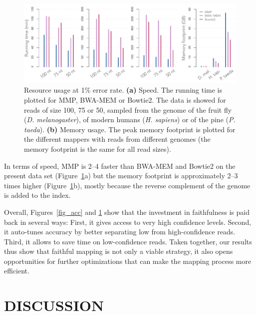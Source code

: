\documentclass[a4,center,fleqn]{NAR}
\begin{document}
\begin{figure}[t]
\begin{center}
\includegraphics[scale=.58]{fig_timem.pdf}
\end{center}
\caption{Resource usage at 1\% error rate. \textbf{(a)} Speed. The running
time is plotted for MMP, BWA-MEM or Bowtie2. The data is showed for reads
of size 100, 75 or 50, sampled from the genome of the fruit fly
(\textit{D. melanogaster}), of modern humans (\textit{H. sapiens}) or of
the pine (\textit{P. taeda}). \textbf{(b)} Memory usage. The peak memory
footprint is plotted for the different mappers with reads from different
genomes (the memory footprint is the same for all read sizes).}
\label{fig_timem}
\end{figure}

In terms of speed, MMP is 2--4 faster than BWA-MEM and Bowtie2 on the
present data set (Figure~\ref{fig_timem}a) but the memory footprint is
approximately 2--3 times higher (Figure~\ref{fig_timem}b), mostly because
the reverse complement of the genome is added to the index.

Overall, Figures~\ref{fig_acc} and \ref{fig_timem} show that the
investment in faithfulness is paid back in several ways: First, it gives
access to very high confidence levels. Second, it auto-tunes accuracy by
better separating low from high-confidence reads. Third, it allows to save
time on low-confidence reads. Taken together, our results thus show that
faithful mapping is not only a viable strategy, it also opens
opportunities for further optimizations that can make the mapping process
more efficient.


\section{DISCUSSION}
\end{document}

